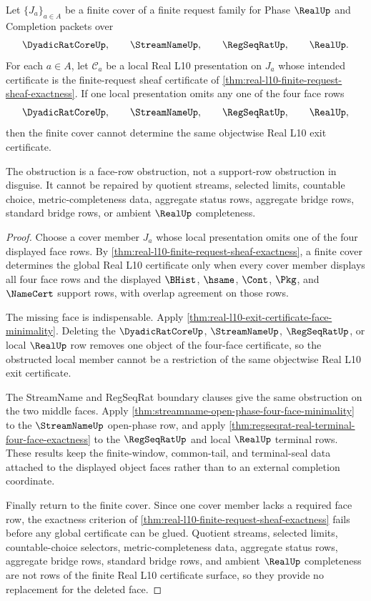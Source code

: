 \begin{theorem}
\label{thm:real-l10-finite-cover-face-removal-obstruction}
Let $\{J_a\}_{a \in A}$ be a finite cover of a finite request family for Phase $\RealUp$ and Completion packets over
$$
\DyadicRatCoreUp,\qquad \StreamNameUp,\qquad \RegSeqRatUp,\qquad \RealUp .
$$
For each $a \in A$, let $\mathcal C_a$ be a local Real L10 presentation on $J_a$ whose intended certificate is the finite-request sheaf certificate of \autoref{thm:real-l10-finite-request-sheaf-exactness}. If one local presentation omits any one of the four face rows
$$
\DyadicRatCoreUp,\qquad \StreamNameUp,\qquad \RegSeqRatUp,\qquad \RealUp,
$$
then the finite cover cannot determine the same objectwise Real L10 exit certificate.

The obstruction is a face-row obstruction, not a support-row obstruction in disguise. It cannot be repaired by quotient streams, selected limits, countable choice, metric-completeness data, aggregate status rows, aggregate bridge rows, standard bridge rows, or ambient $\RealUp$ completeness.
\end{theorem}
\begin{proof}
Choose a cover member $J_a$ whose local presentation omits one of the four displayed face rows. By \autoref{thm:real-l10-finite-request-sheaf-exactness}, a finite cover determines the global Real L10 certificate only when every cover member displays all four face rows and the displayed $\BHist$, $\hsame$, $\Cont$, $\Pkg$, and $\NameCert$ support rows, with overlap agreement on those rows.

The missing face is indispensable. Apply \autoref{thm:real-l10-exit-certificate-face-minimality}. Deleting the $\DyadicRatCoreUp$, $\StreamNameUp$, $\RegSeqRatUp$, or local $\RealUp$ row removes one object of the four-face certificate, so the obstructed local member cannot be a restriction of the same objectwise Real L10 exit certificate.

The StreamName and RegSeqRat boundary clauses give the same obstruction on the two middle faces. Apply \autoref{thm:streamname-open-phase-four-face-minimality} to the $\StreamNameUp$ open-phase row, and apply \autoref{thm:regseqrat-real-terminal-four-face-exactness} to the $\RegSeqRatUp$ and local $\RealUp$ terminal rows. These results keep the finite-window, common-tail, and terminal-seal data attached to the displayed object faces rather than to an external completion coordinate.

Finally return to the finite cover. Since one cover member lacks a required face row, the exactness criterion of \autoref{thm:real-l10-finite-request-sheaf-exactness} fails before any global certificate can be glued. Quotient streams, selected limits, countable-choice selectors, metric-completeness data, aggregate status rows, aggregate bridge rows, standard bridge rows, and ambient $\RealUp$ completeness are not rows of the finite Real L10 certificate surface, so they provide no replacement for the deleted face.
\end{proof}
